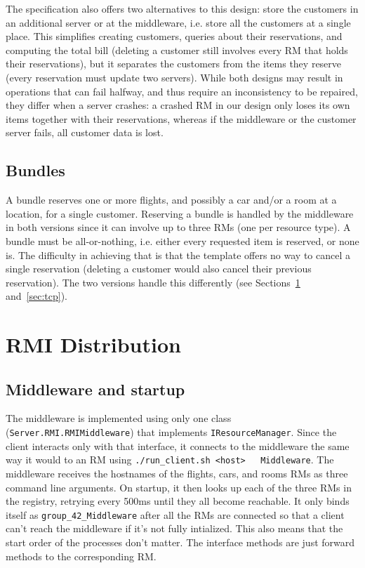 \documentclass[10pt]{article}
\newcommand{\code}[1]{\lstinline{#1}}
\begin{document}
The specification also offers two alternatives to this design: store the customers
in an additional server or at the middleware, i.e. store all the customers at a
single place. This simplifies creating customers, queries about their reservations,
and computing the total bill (deleting a customer still involves every RM that
holds their reservations), but it separates the customers from the items they
reserve (every reservation must update two servers). While both designs may result
in operations that can fail halfway, and thus require an inconsistency to be
repaired, they differ when a server crashes: a crashed RM in our design only loses
its own items together with their reservations, whereas if the middleware or the
customer server fails, all customer data is lost.

\subsection{Bundles}

A bundle reserves one or more flights, and possibly a car and/or a room at a
location, for a single customer. Reserving a bundle is handled by the middleware
in both versions since it can involve up to three RMs (one per resource type).
A bundle must be all-or-nothing, i.e. either every requested item is reserved,
or none is. The difficulty in achieving that is that the template offers no way
to cancel a single reservation (deleting a customer would also cancel their
previous reservation). The two versions handle this differently (see
Sections~\ref{sec:rmi} and~\ref{sec:tcp}).


\section{RMI Distribution}\label{sec:rmi}

\subsection{Middleware and startup}

The middleware is implemented using only one class
(\code{Server.RMI.RMIMiddleware}) that implements \code{IResourceManager}.
Since the client interacts only with that interface, it connects to the
middleware the same way it would to an RM using \code{./run_client.sh <host>
  Middleware}. The middleware receives the hostnames of the flights, cars, and
rooms RMs as three command line arguments. On startup, it then looks up each of
the three RMs in the registry, retrying every 500ms until they all become
reachable. It only binds itself as \code{group_42_Middleware} after all the RMs
are connected so that a client can't reach the middleware if it's not fully
intialized. This also means that the start order of the processes don't matter.
The interface methods are just forward methods to the corresponding RM.
\end{document}
